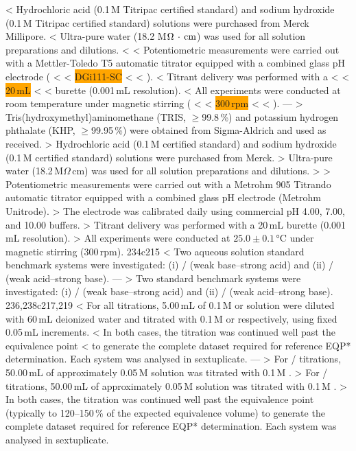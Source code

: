 < Hydrochloric acid (0.1\,M Titripac certified standard) and sodium hydroxide (0.1\,M Titripac certified standard) solutions were purchased from Merck Millipore.
< Ultra-pure water (18.2 M$\Omega\,\cdot\,{\rm cm}$) was used for all solution preparations and dilutions.
< 
< Potentiometric measurements were carried out with a Mettler-Toledo T5 automatic titrator equipped with a combined glass pH electrode (
< %
< \colorbox{orange}{DGi111-SC}
< %
< ).
< Titrant delivery was performed with a
< %
< \colorbox{orange}{20\,mL}
< %
< burette (0.001\,mL resolution).
< All experiments were conducted at room temperature under magnetic stirring (
< %
< \colorbox{orange}{300\,rpm}
< %
< ).
---
> Tris(hydroxymethyl)aminomethane (TRIS, $\geq$99.8\,\%) and potassium hydrogen phthalate (KHP, $\geq$99.95\,\%) were obtained from Sigma-Aldrich and used as received.
> Hydrochloric acid (0.1\,M certified standard) and sodium hydroxide (0.1\,M certified standard) solutions were purchased from Merck.
> Ultra-pure water (18.2\,M$\Omega$\,cm) was used for all solution preparations and dilutions.
> 
> Potentiometric measurements were carried out with a Metrohm 905 Titrando automatic titrator equipped with a combined glass pH electrode (Metrohm Unitrode).
> The electrode was calibrated daily using commercial pH 4.00, 7.00, and 10.00 buffers.
> Titrant delivery was performed with a 20\,mL burette (0.001\,mL resolution).
> All experiments were conducted at $25.0 \pm 0.1$\,°C under magnetic stirring (300\,rpm).
234c215
< Two aqueous solution standard benchmark systems were investigated: (i) / (weak base–strong acid) and (ii) / (weak acid–strong base).
---
> Two standard benchmark systems were investigated: (i) / (weak base–strong acid) and (ii) / (weak acid–strong base).
236,238c217,219
< For all titrations, 5.00\,mL of 0.1\,M  or  solution were diluted with 60\,mL deionized water and titrated with 0.1\,M  or  respectively, using fixed 0.05\,mL increments.
< In both cases, the titration was continued well past the equivalence point %
< to generate the complete dataset required for reference EQP* determination. Each system was analysed in sextuplicate.
---
> For / titrations, 50.00\,mL of approximately 0.05\,M  solution was titrated with 0.1\,M .
> For / titrations, 50.00\,mL of approximately 0.05\,M  solution was titrated with 0.1\,M .
> In both cases, the titration was continued well past the equivalence point (typically to 120–150\,\% of the expected equivalence volume) to generate the complete dataset required for reference EQP* determination. Each system was analysed in sextuplicate.
